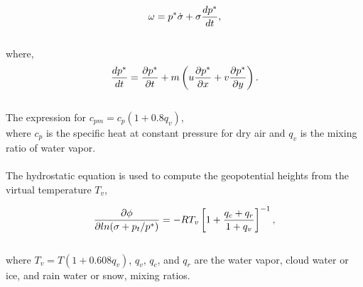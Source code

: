 \begin{eqnarray} \omega = p^{\ast} \dot{\sigma} + \sigma {dp^{\ast} \over dt},
\end{eqnarray} \noindent \\ where, \begin{eqnarray} {dp^{\ast} \over dt} =
{\partial{p^{\ast}} \over \partial{t}} + m \left( u {\partial{p^{\ast}} \over
\partial{x}} + v {\partial{p^{\ast}} \over \partial{y}} \right).  \end{eqnarray}
\\

\noindent The expression for $c_{pm} = c_p(1+0.8q_v)$, \noindent \\ where $c_p$
is the specific heat at constant pressure for dry air and $q_v$ is the mixing
ratio of water vapor.  \\

 \\ \noindent The hydrostatic equation is
used to compute the geopotential heights from the virtual temperature $T_v$,

\begin{eqnarray} {\partial{\phi} \over \partial l n (\sigma + p_t / p^{\ast})} =
-RT_v \left[ 1 + {q_c + q_r \over 1 + q_v} \right]^{-1}, \end{eqnarray}
\noindent \\ where $T_v = T(1 + 0.608q_v)$, $q_v$, $q_c$, and $q_r$ are the
water vapor, cloud water or ice, and rain water or snow, mixing ratios.  


